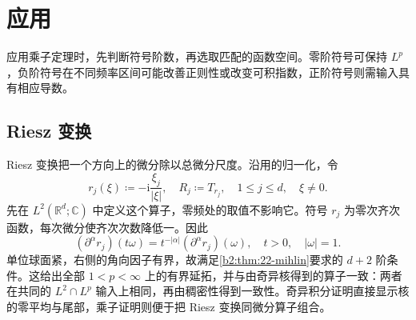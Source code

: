 \section{应用}
\label{b2:sec:2203}

应用乘子定理时，先判断符号阶数，再选取匹配的函数空间。零阶符号可保持 \(L^p\)，负阶符号在不同频率区间可能改善正则性或改变可积指数，正阶符号则需输入具有相应导数。

\subsection{Riesz 变换}
\label{b2:subsec:220301}

Riesz 变换把一个方向上的微分除以总微分尺度。沿用的归一化，令
\[
 r_j(\xi)\coloneqq-\mathrm i\frac{\xi_j}{|\xi|},
 \quad R_j\coloneqq T_{r_j},
 \quad 1\leq j\leq d,\quad \xi\ne0.
\]
先在 \(L^2(\mathbb R^d;\mathbb C)\) 中定义这个算子，零频处的取值不影响它。符号 \(r_j\) 为零次齐次函数，每次微分使齐次次数降低一。因此
\[
 (\partial^\alpha r_j)(t\omega)
 =t^{-|\alpha|}(\partial^\alpha r_j)(\omega),
 \quad t>0,\quad |\omega|=1.
\]
单位球面紧，右侧的角向因子有界，故满足\cref{b2:thm:22-mihlin}要求的 \(d+2\) 阶条件。这给出全部 \(1<p<\infty\) 上的有界延拓，并与由奇异核得到的算子一致：两者在共同的 \(L^2\cap L^p\) 输入上相同，再由稠密性得到一致性。奇异积分证明直接显示核的零平均与尾部，乘子证明则便于把 Riesz 变换同微分算子组合。

